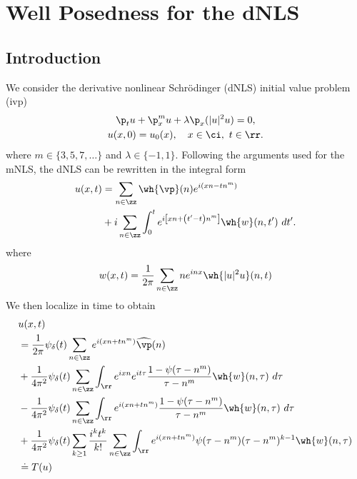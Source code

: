 \chapter{Well Posedness for the dNLS}
%
%
\section{Introduction}
We consider the derivative nonlinear Schr{\"o}dinger (dNLS) initial value problem (ivp)
%
%
\begin{gather}
	\label{1dNLS-eq}
	\p_t u + \p_x^{m} u + \lambda \p_x (|u|^2 u) = 0,
	\\
	\label{1dNLS-init-data}
	u(x,0) = u_0(x), \quad x \in \ci, \ t \in \rr.
\end{gather}
%
%
where $m \in \{3, 5, 7,\dots \}$ and $\lambda \in \{-1, 1\}$.
%
%
Following the arguments used for the mNLS, the dNLS can be rewritten in the
integral form %
%
\begin{equation}
	\label{1dNLS-integral-form}
	\begin{split}
		u(x,t) & = \sum_{n \in \zz} \wh{\vp}(n) e^{i\left( xn - t n^m 
		\right)} 
		\\
		& + i \sum_{n \in \zz} \int_0^t e^{i\left[ xn + \left( t' - t 
		\right) n^m \right]} \wh{w}(n, t') \ dt'.
	\end{split}
\end{equation}
%
%
where 
%
%
\begin{equation*}
\begin{split}
  w(x,t) = \frac{1}{2 \pi} \sum_{n \in \zz} n e^{inx}  \wh{| u |^{2} u}(n, t)
\end{split}
\end{equation*}
%
%
We then localize in time to obtain 
%
%
\begin{align}
	\label{1main-int-expression-0}
	& u(x, t) 
		\\
		\label{1main-int-expression-1}
		& = \frac{1}{2 \pi} \psi_{\delta}(t) \sum_{n \in \zz} e^{i(xn + tn^{m 
		})} \widehat{\vp}(n) 
		\\
		\label{1main-int-expression-2}
		& + \frac{1}{4 \pi^2} \psi_{\delta}(t) \sum_{n\in \zz} \int_\rr e^{ixn}  
		e^{it \tau} \frac{ 1 - \psi(\tau -  n^m) 
		}{\tau -  n^m} \wh{w}(n, \tau) \ d \tau
		\\
		\label{1main-int-expression-3}
		& - \frac{1}{4 \pi^2} \psi_{\delta}(t) \sum_{n\in \zz} \int_\rr e^{i(xn + 
		t n^m)}
		 \frac{1- \psi(\tau -  n^m)}{\tau -  n^m} \wh{w}(n, \tau) \ d \tau
		\\
		\label{1main-int-expression-4}
		& + \frac{1}{4 \pi^2} \psi_{\delta}(t) \sum_{k \ge 1} \frac{i^k t^k}{k!}
		\sum_{n \in \zz} \int_\rr e^{i(xn + t n^m )}
		\psi(\tau -  n^m) (\tau -  n^m)^{k-1} \wh{w}(n, \tau)  
		\\
		& \doteq T(u) \notag
\end{align}

